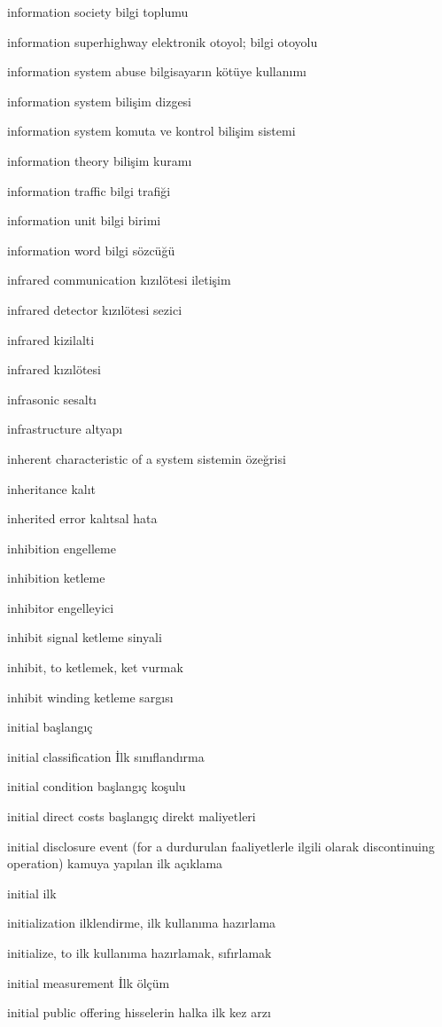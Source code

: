 \documentclass[12pt,fleqn]{article}\usepackage{../../common}
\begin{document}
information society bilgi toplumu

information superhighway elektronik otoyol; bilgi otoyolu

information system abuse bilgisayarın kötüye kullanımı

information system bilişim dizgesi

information system komuta ve kontrol bilişim sistemi

information theory bilişim kuramı

information traffic bilgi trafiği

information unit bilgi birimi

information word bilgi sözcüğü

infrared communication kızılötesi iletişim

infrared detector kızılötesi sezici

infrared kizilalti

infrared kızılötesi

infrasonic sesaltı

infrastructure altyapı

inherent characteristic of a system sistemin özeğrisi

inheritance kalıt

inherited error kalıtsal hata

inhibition engelleme

inhibition ketleme

inhibitor engelleyici

inhibit signal ketleme sinyali

inhibit, to ketlemek, ket vurmak

inhibit winding ketleme sargısı

initial başlangıç

initial classification İlk sınıflandırma

initial condition başlangıç koşulu

initial direct costs başlangıç direkt maliyetleri

initial disclosure event (for a durdurulan faaliyetlerle ilgili olarak discontinuing operation) kamuya yapılan ilk açıklama

initial ilk

initialization ilklendirme, ilk kullanıma hazırlama

initialize, to ilk kullanıma hazırlamak, sıfırlamak

initial measurement İlk ölçüm

initial public offering hisselerin halka ilk kez arzı
\end{document}
